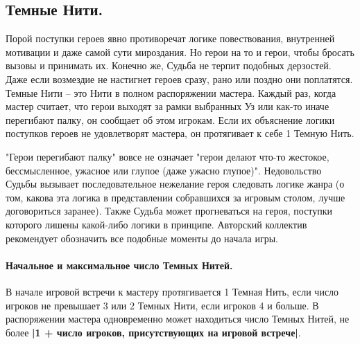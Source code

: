 \subsection{Темные Нити.} 
Порой поступки героев явно противоречат логике повествования, внутренней мотивации и даже самой сути мироздания. Но герои на то и герои, чтобы бросать вызовы и принимать их. Конечно же, Судьба не терпит подобных дерзостей. Даже если возмездие не настигнет героев сразу, рано или поздно они поплатятся.
\newline Темные Нити – это Нити в полном распоряжении мастера. Каждый раз, когда мастер считает, что герои выходят за рамки выбранных Уз или как-то иначе перегибают палку, он сообщает об этом игрокам. Если их объяснение логики поступков героев не удовлетворят мастера, он протягивает к себе 1 Темную Нить. 
\begin{tcolorbox}
    "Герои перегибают палку" вовсе не означает "герои делают что-то жестокое, бессмысленное, ужасное или глупое (даже ужасно глупое)". Недовольство Судьбы вызывает последовательное нежелание героя следовать логике жанра (о том, какова эта логика в представлении собравшихся за игровым столом, лучше договориться заранее). Также Судьба может прогневаться на героя, поступки которого лишены какой-либо логики в принципе. Авторский коллектив рекомендует обозначить все подобные моменты до начала игры.
\end{tcolorbox}
\paragraph{Начальное и максимальное число Темных Нитей.}
В начале игровой встречи к мастеру протягивается 1 Темная Нить, если число игроков не превышает 3 или 2 Темных Нити, если игроков 4 и больше.
\newline В распоряжении мастера одновременно может находиться число Темных Нитей, не более  \textbf{|1 + число игроков, присутствующих на игровой встрече|}.

